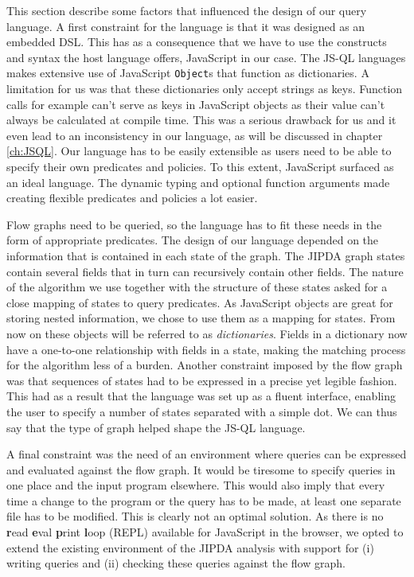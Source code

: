This section describe some factors that influenced the design of our query language. A first constraint for the language is that it was designed as an embedded DSL. This has as a consequence that we have to use the constructs and syntax the host language offers, JavaScript in our case. The JS-QL languages makes extensive use of JavaScript \texttt{Object}s that function as dictionaries. A limitation for us was that these dictionaries only accept strings as keys. Function calls for example can't serve as keys in JavaScript objects as their value can't always be calculated at compile time. This was a serious drawback for us and it even lead to an inconsistency in our language, as will be discussed in chapter \ref{ch:JSQL}. 
Our language has to be easily extensible as users need to be able to specify their own predicates and policies. To this extent, JavaScript surfaced as an ideal language. The dynamic typing and optional function arguments made creating flexible predicates and policies a lot easier.

Flow graphs need to be queried, so the language has to fit these needs in the form of appropriate predicates. The design of our language depended on the information that is contained in each state of the graph. The JIPDA graph states contain several fields that in turn can recursively contain other fields. The nature of the algorithm we use together with the structure of these states asked for a close mapping of states to query predicates. As JavaScript objects are great for storing nested information, we chose to use them as a mapping for states. From now on these objects will be referred to as \textit{dictionaries}. Fields in a dictionary now have a one-to-one relationship with fields in a state, making the matching process for the algorithm less of a burden. Another constraint imposed by the flow graph was that sequences of states had to be expressed in a precise yet legible fashion. This had as a result that the language was set up as a fluent interface, enabling the user to specify a number of states separated with a simple dot. We can thus say that the type of graph helped shape the JS-QL language.

A final constraint was the need of an environment where queries can be expressed and evaluated against the flow graph. It would be tiresome to specify queries in one place and the input program elsewhere. This would also imply that every time a change to the program or the query has to be made, at least one separate file has to be modified. This is clearly not an optimal solution. As there is no \textbf{r}ead \textbf{e}val \textbf{p}rint \textbf{l}oop (REPL) available for JavaScript in the browser, we opted to extend the existing environment of the JIPDA analysis with support for (i) writing queries and (ii) checking these queries against the flow graph.


